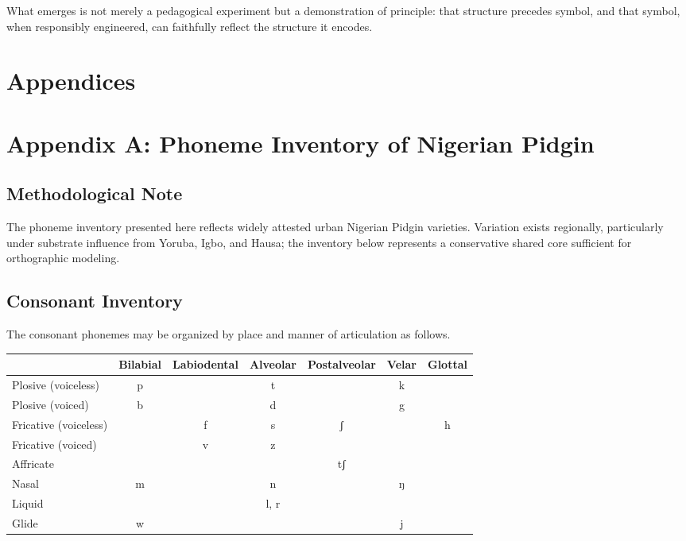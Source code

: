 \documentclass[12pt]{article}
\begin{document}
What emerges is not merely a pedagogical experiment but a demonstration of principle: that structure precedes symbol, and that symbol, when responsibly engineered, can faithfully reflect the structure it encodes.

\newpage
\section*{Appendices}

\appendix
\section{Appendix A: Phoneme Inventory of Nigerian Pidgin}

\subsection{Methodological Note}

The phoneme inventory presented here reflects widely attested urban Nigerian Pidgin varieties. Variation exists regionally, particularly under substrate influence from Yoruba, Igbo, and Hausa; the inventory below represents a conservative shared core sufficient for orthographic modeling.

\subsection{Consonant Inventory}

The consonant phonemes may be organized by place and manner of articulation as follows.

\begin{center}
\begin{tabular}{lcccccc}
 & Bilabial & Labiodental & Alveolar & Postalveolar & Velar & Glottal \\ \hline
Plosive (voiceless) & p &  & t &  & k &  \\
Plosive (voiced) & b &  & d &  & g &  \\
Fricative (voiceless) &  & f & s & ʃ &  & h \\
Fricative (voiced) &  & v & z &  &  &  \\
Affricate &  &  &  & tʃ &  &  \\
Nasal & m &  & n &  & ŋ &  \\
Liquid &  &  & l, r &  &  &  \\
Glide & w &  &  &  & j &  \\
\end{tabular}
\end{center}
\end{document}
